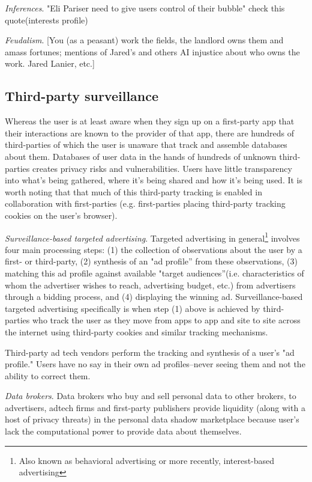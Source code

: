 \documentclass[11pt, oneside]{article}   	%
\begin{document}
\emph{Inferences}. "Eli Pariser need to give users control of their bubble" check this quote\cite[p66]{McNamee2020}(interests profile)

\emph{Feudalism}. [You (as a peasant) work the fields, the landlord owns them and amass fortunes; mentions of Jared's and others AI injustice about who owns the work. Jared Lanier, etc.]

\subsection{Third-party surveillance}

Whereas the user is at least aware when they sign up on a first-party app that their interactions are known to the provider of that app, there are hundreds of third-parties of which the user is unaware that track and assemble databases about them. Databases of user data in the hands of hundreds of unknown third-parties creates privacy risks and vulnerabilities. Users have little transparency into what's being gathered, where it's being shared and how it's being used. It is worth noting that that much of this third-party tracking is enabled in collaboration with first-parties (e.g. first-parties placing third-party tracking cookies on the user's browser).

\emph{Surveillance-based targeted advertising}. Targeted advertising in general\footnote{Also known as behavioral advertising or more recently, interest-based advertising} involves four main processing steps: (1) the collection of observations about the user by a first- or third-party, (2) synthesis of an "ad profile” from these observations, (3) matching this ad profile against available "target audiences”(i.e. characteristics of whom the advertiser wishes to reach, advertising budget, etc.) from advertisers through a bidding process, and (4) displaying the winning ad. Surveillance-based targeted advertising specifically is when step (1) above is achieved by third-parties who track the user as they move from apps to app and site to site across the internet using third-party cookies and similar tracking mechanisms. 

Third-party ad tech vendors perform the tracking and synthesis of a user's "ad profile." Users have no say in their own ad profiles--never seeing them and not the ability to correct them.

\emph{Data brokers}. Data brokers who buy and sell personal data to other brokers, to advertisers, adtech firms and first-party publishers provide liquidity (along with a host of privacy threats) in the personal data shadow marketplace because user's lack the computational power to provide data about themselves.
\end{document}
